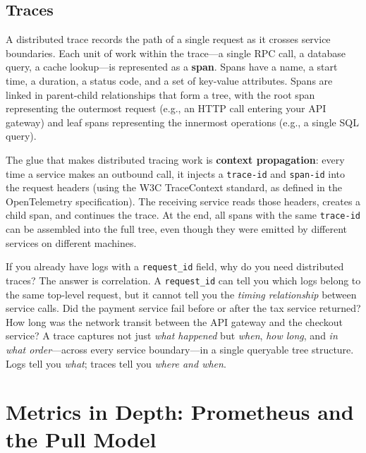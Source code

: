 \documentclass[11pt,a4paper]{article}
\begin{document}
\subsection{Traces}

A distributed trace records the path of a single request as it crosses service boundaries. Each unit of work within the trace---a single RPC call, a database query, a cache lookup---is represented as a \textbf{span}. Spans have a name, a start time, a duration, a status code, and a set of key-value attributes. Spans are linked in parent-child relationships that form a tree, with the root span representing the outermost request (e.g., an HTTP call entering your API gateway) and leaf spans representing the innermost operations (e.g., a single SQL query).

The glue that makes distributed tracing work is \textbf{context propagation}: every time a service makes an outbound call, it injects a \texttt{trace-id} and \texttt{span-id} into the request headers (using the W3C TraceContext standard, as defined in the OpenTelemetry specification). The receiving service reads those headers, creates a child span, and continues the trace. At the end, all spans with the same \texttt{trace-id} can be assembled into the full tree, even though they were emitted by different services on different machines.

\begin{thinkbox}
  If you already have logs with a \texttt{request\_id} field, why do you need distributed traces? The answer is correlation. A \texttt{request\_id} can tell you which logs belong to the same top-level request, but it cannot tell you the \emph{timing relationship} between service calls. Did the payment service fail before or after the tax service returned? How long was the network transit between the API gateway and the checkout service? A trace captures not just \emph{what happened} but \emph{when}, \emph{how long}, and \emph{in what order}---across every service boundary---in a single queryable tree structure. Logs tell you \emph{what}; traces tell you \emph{where and when}.
\end{thinkbox}

\section{Metrics in Depth: Prometheus and the Pull Model}
\end{document}
